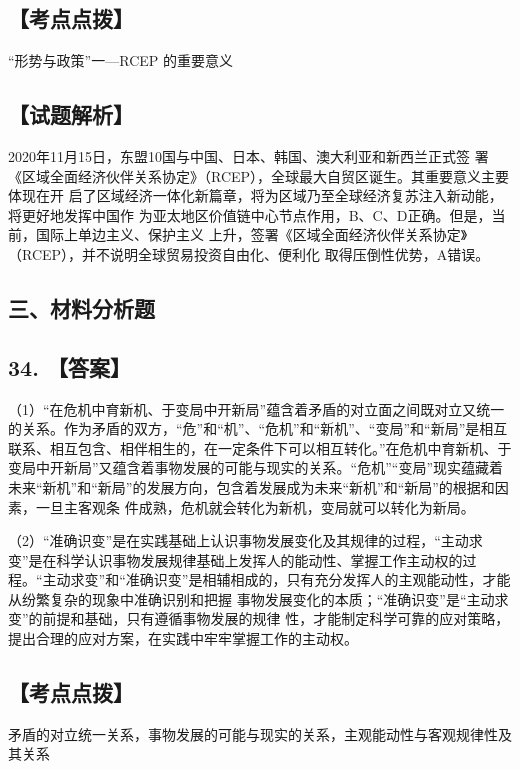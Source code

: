 \documentclass[UTF8,11pt]{ctexart}
\begin{document}
\subsection*{【考点点拨】}

“形势与政策”一—RCEP 的重要意义


\subsection*{【试题解析】}

2020年11月15日，东盟10国与中国、日本、韩国、澳大利亚和新西兰正式签 署《区域全面经济伙伴关系协定》（RCEP），全球最大自贸区诞生。其重要意义主要体现在开 启了区域经济一体化新篇章，将为区域乃至全球经济复苏注入新动能，将更好地发挥中国作 为亚太地区价值链中心节点作用，B、C、D正确。但是，当前，国际上单边主义、保护主义 上升，签署《区域全面经济伙伴关系协定》（RCEP），并不说明全球贸易投资自由化、便利化 取得压倒性优势，A错误。


\subsection*{三、材料分析题}

\subsection*{34. 【答案】}

（1）“在危机中育新机、于变局中开新局”蕴含着矛盾的对立面之间既对立又统一的关系。作为矛盾的双方，“危”和“机”、“危机”和“新机”、“变局”和“新局”是相互联系、相互包含、相伴相生的，在一定条件下可以相互转化。”在危机中育新机、于变局中开新局”又蕴含着事物发展的可能与现实的关系。“危机”“变局”现实蕴藏着未来“新机”和“新局”的发展方向，包含着发展成为未来“新机”和“新局”的根据和因素，一旦主客观条 件成熟，危机就会转化为新机，变局就可以转化为新局。


（2）“准确识变”是在实践基础上认识事物发展变化及其规律的过程，“主动求变”是在科学认识事物发展规律基础上发挥人的能动性、掌握工作主动权的过程。“主动求变”和“准确识变”是相辅相成的，只有充分发挥人的主观能动性，才能从纷繁复杂的现象中准确识别和把握 事物发展变化的本质；“准确识变”是“主动求变”的前提和基础，只有遵循事物发展的规律 性，才能制定科学可靠的应对策略，提出合理的应对方案，在实践中牢牢掌握工作的主动权。


\subsection*{【考点点拨】}

矛盾的对立统一关系，事物发展的可能与现实的关系，主观能动性与客观规律性及其关系
\end{document}
